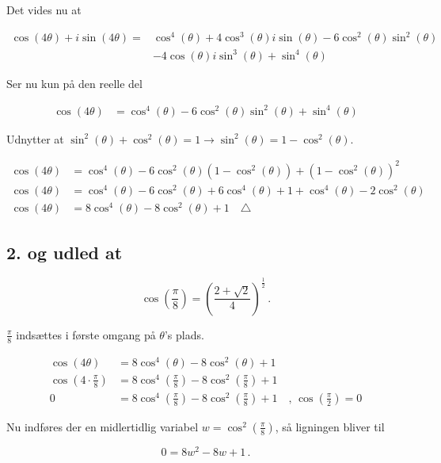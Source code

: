 \documentclass[a4paper, 12pt]{article}
\begin{document}
Det vides nu at

\begin{align*}
    \cos(4\theta) + i \sin(4\theta) = &\cos^4(\theta) + 4 \cos^3(\theta) i \sin(\theta) - 6 \cos^2(\theta) \sin^2(\theta) \\
    &- 4 \cos(\theta) i \sin^3(\theta) + \sin^4(\theta) 
\end{align*}

Ser nu kun på den reelle del

\begin{align*}
    \cos(4\theta) &= \cos^4(\theta) -6 \cos^2(\theta) \sin^2(\theta) + \sin^4(\theta)
\end{align*}

Udnytter at \(\sin^2(\theta) + \cos^2(\theta) =1 \to \sin^2(\theta) = 1 - \cos^2(\theta)\).

\begin{align*}
    \cos(4\theta) &= \cos^4(\theta) -6 \cos^2(\theta) \left(1 - \cos^2(\theta)\right) + \left(1 - \cos^2(\theta)\right)^2 \\
    \cos(4\theta) &= \cos^4(\theta) -6 \cos^2(\theta)  + 6\cos^4(\theta) + 1 +\cos^4(\theta) -2\cos^2(\theta)\\
    \cos(4\theta) &= 8\cos^4(\theta) -8 \cos^2(\theta)  + 1 \quad \triangle
\end{align*}

\subsection*{2. og udled at}
\label{sec:orge51d93d}

$$\cos\left(\frac{\pi}{8}\right) = \left(\frac{2 + \sqrt{2}}{4}\right)^{\frac{1}{2}}\,.$$

\(\frac{\pi}{8}\) indsættes i første omgang på \(\theta\)'s plads.

\begin{align*}
    \cos(4\theta) &= 8\cos^4(\theta) -8 \cos^2(\theta)  + 1\\
    \cos\left(4\cdot \frac{\pi}{8}\right) &= 8\cos^4\left(\frac{\pi}{8}\right) -8 \cos^2\left(\frac{\pi}{8}\right)  + 1 \\
    0 &= 8\cos^4\left(\frac{\pi}{8}\right) -8 \cos^2\left(\frac{\pi}{8}\right)  + 1 \quad , \, \cos\left(\frac{\pi}{2}\right) =0
\end{align*}

Nu indføres der en midlertidlig variabel \(w=\cos^2\left(\frac{\pi}{8}\right)\), så ligningen bliver til

$$0 = 8 w^2 -8w +1 \,.$$
\end{document}
